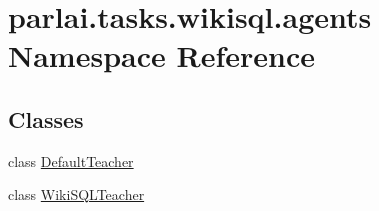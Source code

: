 \hypertarget{namespaceparlai_1_1tasks_1_1wikisql_1_1agents}{}\section{parlai.\+tasks.\+wikisql.\+agents Namespace Reference}
\label{namespaceparlai_1_1tasks_1_1wikisql_1_1agents}
\subsection*{Classes}
\begin{DoxyCompactItemize}
\item 
class \hyperlink{classparlai_1_1tasks_1_1wikisql_1_1agents_1_1DefaultTeacher}{Default\+Teacher}
\item 
class \hyperlink{classparlai_1_1tasks_1_1wikisql_1_1agents_1_1WikiSQLTeacher}{Wiki\+S\+Q\+L\+Teacher}
\end{DoxyCompactItemize}
